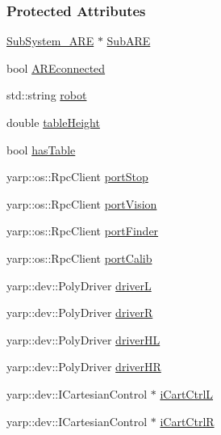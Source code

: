 \subsubsection*{Protected Attributes}
\begin{DoxyCompactItemize}
\item 
\hyperlink{group__icubclient__subsystems_classicubclient_1_1SubSystem__ARE}{Sub\+System\+\_\+\+A\+RE} $\ast$ \hyperlink{group__icubclient__subsystems_a8321840d15271ec9306aea8b88ca166f}{Sub\+A\+RE}
\item 
bool \hyperlink{group__icubclient__subsystems_ae8cb5c87396b9f0c2884ceb5706da0cb}{A\+R\+Econnected}
\item 
std\+::string \hyperlink{group__icubclient__subsystems_aeeeaf8af66dcee9d7c1173528bc30d7a}{robot}
\item 
double \hyperlink{group__icubclient__subsystems_add03e20b9b8be1dad5999fb47e572679}{table\+Height}
\item 
bool \hyperlink{group__icubclient__subsystems_a818b2bfd4f80d10f8065bee519cb6529}{has\+Table}
\item 
yarp\+::os\+::\+Rpc\+Client \hyperlink{group__icubclient__subsystems_a8718260a66be2d5a3ec02f9065fce749}{port\+Stop}
\item 
yarp\+::os\+::\+Rpc\+Client \hyperlink{group__icubclient__subsystems_a90fe9f8b078cfdb1791919968f056e55}{port\+Vision}
\item 
yarp\+::os\+::\+Rpc\+Client \hyperlink{group__icubclient__subsystems_a50a8081c5f290dfcbd89707c699475c1}{port\+Finder}
\item 
yarp\+::os\+::\+Rpc\+Client \hyperlink{group__icubclient__subsystems_a90197083a8928d56ef80028a9db44dec}{port\+Calib}
\item 
yarp\+::dev\+::\+Poly\+Driver \hyperlink{group__icubclient__subsystems_acf3f0af27d083e7e4dc5d63d47419986}{driverL}
\item 
yarp\+::dev\+::\+Poly\+Driver \hyperlink{group__icubclient__subsystems_a2b0310b9cf7896d08045e36e52b428fa}{driverR}
\item 
yarp\+::dev\+::\+Poly\+Driver \hyperlink{group__icubclient__subsystems_aa013e93b2c134a421130c01f3e95798b}{driver\+HL}
\item 
yarp\+::dev\+::\+Poly\+Driver \hyperlink{group__icubclient__subsystems_a5e4aa27bee2286177e8b7916fdc61bfd}{driver\+HR}
\item 
yarp\+::dev\+::\+I\+Cartesian\+Control $\ast$ \hyperlink{group__icubclient__subsystems_ac3e11b504080f7e19032973a2719a9a7}{i\+Cart\+CtrlL}
\item 
yarp\+::dev\+::\+I\+Cartesian\+Control $\ast$ \hyperlink{group__icubclient__subsystems_ad0fc8e0142ccdb3ebd3777bf1a0e37b6}{i\+Cart\+CtrlR}
\end{DoxyCompactItemize}


